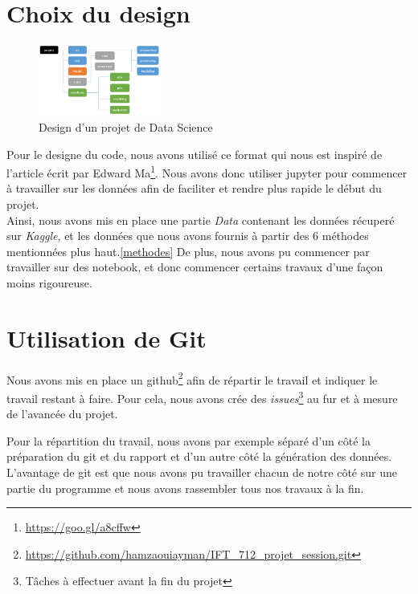 \documentclass[12pt]{article}
\begin{document}
\newpage
\appendix
\section{Choix du design}
\begin{figure}
	\includegraphics[width=4cm]{./projet_structure.png}
	\caption{Design d'un projet de Data Science}
\end{figure}
Pour le designe du code, nous avons utilisé ce format qui nous est inspiré de l'article écrit par Edward Ma\footnote{\url{https://goo.gl/a8cffw}}. Nous avons donc utiliser jupyter pour commencer à travailler sur les données afin de faciliter et rendre plus rapide le début du projet.\\ 
Ainsi, nous avons mis en place une partie \emph{Data} contenant les données récuperé sur \textit{Kaggle}, et les données que nous avons fournis à partir des 6 méthodes mentionnées plus haut.\ref{methodes} De plus, nous avons pu commencer par travailler sur des notebook, et donc commencer certains travaux d'une façon moins rigoureuse. 


\section{Utilisation de Git}
Nous avons mis en place un github\footnote{\url{https://github.com/hamzaouiayman/IFT_712_projet_session.git}} afin de répartir le travail et indiquer le travail restant à faire. Pour cela, nous avons crée des \textit{issues}\footnote{Tâches à effectuer avant la fin du projet} au fur et à mesure de l'avancée du projet. 

Pour la répartition du travail, nous avons par exemple séparé d'un côté la préparation du git et du rapport et d'un autre côté la génération des données. L'avantage de git est que nous avons pu travailler chacun de notre côté sur une partie du programme et nous avons rassembler tous nos travaux à la fin.
\end{document}
